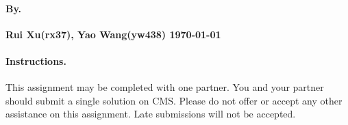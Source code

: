 \documentclass[11pt]{article}
\begin{document}

\vspace*{-1.25\bigskipamount}


\paragraph{By.} 
%
\textbf{Rui Xu(rx37), Yao Wang(yw438) \hfill \today}

\paragraph{Instructions.} 
%
This assignment may be completed with one partner. You and your
partner should submit a single solution on CMS. Please do not offer or
accept any other assistance on this assignment. Late submissions will
not be accepted.

\newcommand{\ELVIS}[2]{#1~\mtt{?:}~#2}
\end{document}
